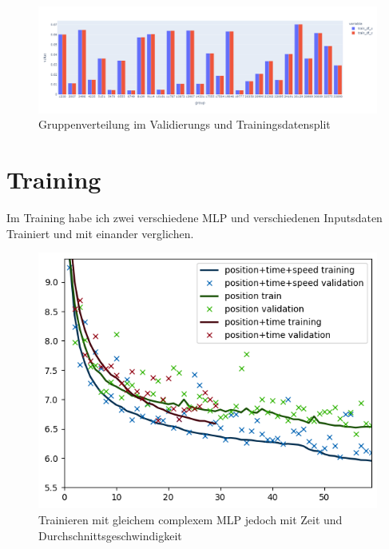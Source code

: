 \documentclass[a4paper]{article}
\begin{document}
    \begin{figure}[h]
        \includegraphics[scale=0.35]{figures/fig5_gruppen_verteilung}
        \centering
        \caption{Gruppenverteilung im Validierungs und Trainingsdatensplit}
        \label{fig:gruppen_verteilung}
    \end{figure}


    \section{Training}
    \label{sec:training}

    Im Training habe ich zwei verschiedene MLP und verschiedenen Inputsdaten Trainiert und mit einander verglichen.

    \begin{figure}[h]
        \includegraphics[scale=0.6]{figures/fig6_training_different_input_data}
        \centering
        \caption{Trainieren mit gleichem complexem MLP jedoch mit Zeit und Durchschnittsgeschwindigkeit}
        \label{fig:training_different_input}
    \end{figure}
\end{document}
